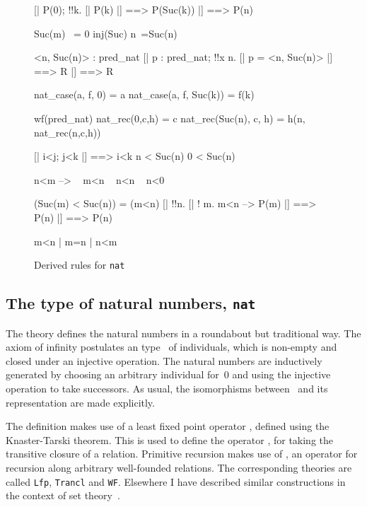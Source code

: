 \begin{figure} \underscoreon
\begin{ttbox}
     [| P(0); !!k. [| P(k) |] ==> P(Suc(k)) |]  ==> P(n)

   Suc(m) ~= 0
        inj(Suc)
    n~=Suc(n)

      <n, Suc(n)> : pred_nat
    [| p : pred_nat;  !!x n. [| p = <n, Suc(n)> |] ==> R |] ==> R

     nat_case(a, f, 0) = a
   nat_case(a, f, Suc(k)) = f(k)

    wf(pred_nat)
      nat_rec(0,c,h) = c
    nat_rec(Suc(n), c, h) = h(n, nat_rec(n,c,h))

     [| i<j;  j<k |] ==> i<k
          n < Suc(n)
  0 < Suc(n)

   n<m --> ~ m<n 
  ~ n<n
      ~ n<0

    (Suc(m) < Suc(n)) = (m<n)
    [| !!n. [| ! m. m<n --> P(m) |] ==> P(n) |]  ==>  P(n)

    m<n | m=n | n<m
\end{ttbox}
\caption{Derived rules for {\tt nat}} \label{hol-nat2}
\end{figure}


\subsection{The type of natural numbers, {\tt nat}}
The theory  defines the natural numbers in a roundabout but
traditional way.  The axiom of infinity postulates an type~ of
individuals, which is non-empty and closed under an injective operation.
The natural numbers are inductively generated by choosing an arbitrary
individual for~0 and using the injective operation to take successors.  As
usual, the isomorphisms between~ and its representation are made
explicitly.

The definition makes use of a least fixed point operator ,
defined using the Knaster-Tarski theorem.  This is used to define the
operator , for taking the transitive closure of a relation.
Primitive recursion makes use of , an operator for recursion
along arbitrary well-founded relations.  The corresponding theories are
called {\tt Lfp}, {\tt Trancl} and {\tt WF}\@.  Elsewhere I have described
similar constructions in the context of set theory~\cite{paulson-set-II}.

